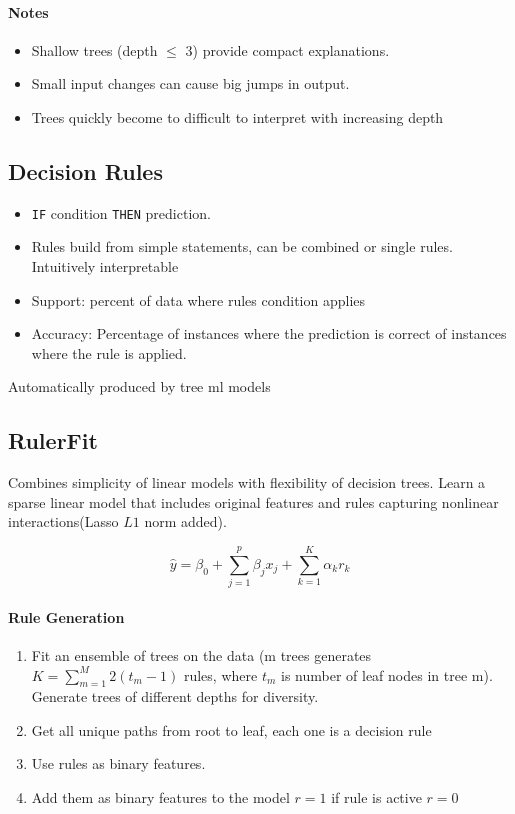 \paragraph{Notes}
\begin{itemize}
	\item Shallow trees (depth $\leq$ 3) provide compact explanations.
	\item Small input changes can cause big jumps in output.
	\item Trees quickly become to difficult to interpret with increasing depth
\end{itemize}

\subsection{Decision Rules}
\begin{itemize}
	\item \texttt{IF} condition \texttt{THEN} prediction.
	\item Rules build from simple statements, can be combined or single rules. Intuitively interpretable
	\item Support: percent of data where rules condition applies
	\item Accuracy: Percentage of instances where the prediction is correct of instances where the rule is applied.
\end{itemize}
Automatically produced by tree ml models

\subsection{RulerFit}
Combines simplicity of linear models with flexibility of decision trees.
Learn a sparse linear model that includes original features and rules capturing nonlinear interactions(Lasso $L1$ norm added).

\begin{equation}
	\hat y = \beta_0 + \sum_{j=1}^{p}\beta_jx_j + \sum_{k=1}^{K} \alpha_kr_k
	\label{eq:RulerFit}
\end{equation}

\paragraph{Rule Generation}
\begin{enumerate}
	\item Fit an ensemble of trees on the data (m trees generates $K = \sum_{m=1}^{M}2(t_m-1)$ rules,
	      where $t_m$ is number of leaf nodes in tree m).
	      Generate trees of different depths for diversity.
	\item Get all unique paths from root to leaf, each one is a decision rule
	\item Use rules as binary features.
	\item Add them as binary features to the model $r = 1$ if rule is active $r=0$
\end{enumerate}






